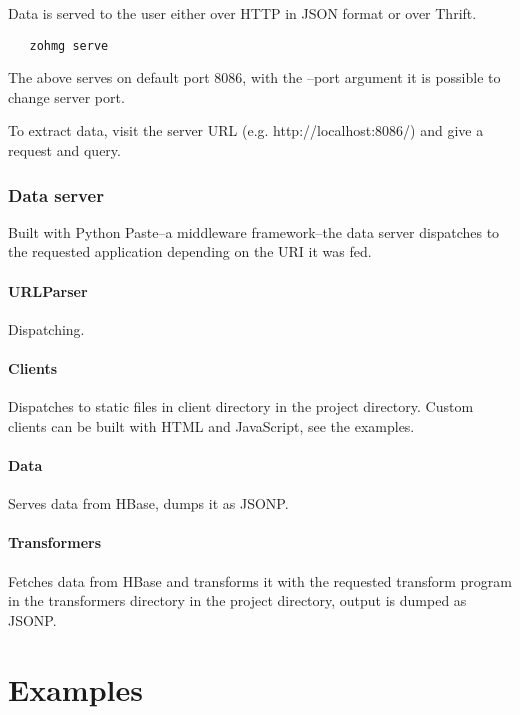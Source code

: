 \documentclass[a4paper,10pt]{book}
\begin{document}
Data is served to the user either over HTTP in JSON format or over Thrift.
\cite{thrift}

\begin{verbatim}
   zohmg serve
\end{verbatim}

\noindent The above serves on default port 8086, with the --port argument
it is possible to change server port.

To extract data, visit the server URL (e.g. http://localhost:8086/) and
give a request and query.


\subsection{Data server}

Built with Python Paste--a middleware framework--the data server dispatches
to the requested application depending on the URI it was fed.


\subsubsection{URLParser}

Dispatching.


\subsubsection{Clients}

Dispatches to static files in client directory in the project directory.
Custom clients can be built with HTML and JavaScript, see the examples.


\subsubsection{Data}

Serves data from HBase, dumps it as JSONP.


\subsubsection{Transformers}

Fetches data from HBase and transforms it with the requested transform
program in the transformers directory in the project directory, output is
dumped as JSONP.



\chapter{Examples}
\end{document}
